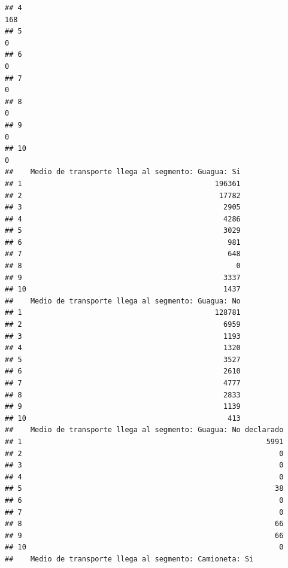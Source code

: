 \documentclass[11pt,]{article}
\begin{document}
\begin{verbatim}
## 4                                                                             168
## 5                                                                               0
## 6                                                                               0
## 7                                                                               0
## 8                                                                               0
## 9                                                                               0
## 10                                                                              0
##    Medio de transporte llega al segmento: Guagua: Si
## 1                                             196361
## 2                                              17782
## 3                                               2905
## 4                                               4286
## 5                                               3029
## 6                                                981
## 7                                                648
## 8                                                  0
## 9                                               3337
## 10                                              1437
##    Medio de transporte llega al segmento: Guagua: No
## 1                                             128781
## 2                                               6959
## 3                                               1193
## 4                                               1320
## 5                                               3527
## 6                                               2610
## 7                                               4777
## 8                                               2833
## 9                                               1139
## 10                                               413
##    Medio de transporte llega al segmento: Guagua: No declarado
## 1                                                         5991
## 2                                                            0
## 3                                                            0
## 4                                                            0
## 5                                                           38
## 6                                                            0
## 7                                                            0
## 8                                                           66
## 9                                                           66
## 10                                                           0
##    Medio de transporte llega al segmento: Camioneta: Si

\end{verbatim}
\end{document}
